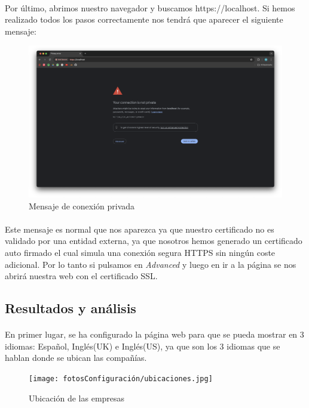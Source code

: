 \paragraph{}
Por último, abrimos nuestro navegador y buscamos https://localhost. Si hemos realizado todos los pasos correctamente nos tendrá que aparecer el siguiente mensaje: 
\begin{figure}[h]
    \centering
    \includegraphics[width=1\linewidth]{conNotPrivate.png}
    \caption{Mensaje de conexión privada}
\end{figure}
\paragraph{}
Este mensaje es normal que nos aparezca ya que nuestro certificado no es validado por una entidad externa, ya que nosotros hemos generado un certificado auto firmado el cual simula una conexión segura HTTPS sin ningún coste adicional. Por lo tanto si pulsamos en \textit{Advanced} y luego en ir a la página se nos abrirá nuestra web con el certificado SSL.

\subsection{Resultados y análisis}
\paragraph{}
En primer lugar, se ha configurado la página web para que se pueda mostrar en 3 idiomas: Español, Inglés(UK) e Inglés(US), ya que son los 3 idiomas que se hablan donde se ubican las compañías. 
\begin{figure}[h]
    \centering
    \texttt{[image: fotosConfiguración/ubicaciones.jpg]}
    \caption{Ubicación de las empresas}
    \label{fig:enter-label}
\end{figure}
